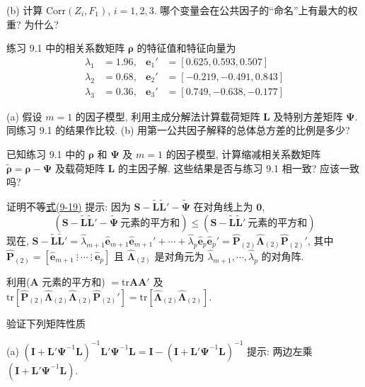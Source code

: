 
(b) 计算 $\mathrm{Corr}(Z_i,F_1)$, $i=1,2,3$. 哪个变量会在公共因子的“命名”上有最大的权重? 为什么?

\quad 练习 9.1 中的相关系数矩阵 $\boldsymbol{\rho}$ 的特征值和特征向量为
\[
\begin{aligned}
\lambda_1&=1.96, & \mathbf{e}_1'&=[0.625,0.593,0.507]\\
\lambda_2&=0.68, & \mathbf{e}_2'&=[-0.219,-0.491,0.843]\\
\lambda_3&=0.36, & \mathbf{e}_3'&=[0.749,-0.638,-0.177]
\end{aligned}
\]

(a) 假设 $m=1$ 的因子模型, 利用主成分解法计算载荷矩阵 $\mathbf{L}$ 及特别方差矩阵 $\boldsymbol{\Psi}$. 同练习 9.1 的结果作比较.
(b) 用第一公共因子解释的总体总方差的比例是多少?

\quad 已知练习 9.1 中的 $\boldsymbol{\rho}$ 和 $\boldsymbol{\Psi}$ 及 $m=1$ 的因子模型, 计算缩减相关系数矩阵 $\tilde{\boldsymbol{\rho}}=\boldsymbol{\rho}-\boldsymbol{\Psi}$ 及载荷矩阵 $\mathbf{L}$ 的主因子解. 这些结果是否与练习 9.1 相一致? 应该一致吗?

\quad 证明不等\hyperref[eq:9-19]{式(9-19)}
提示: 因为 $\mathbf{S}-\tilde{\mathbf{L}}\tilde{\mathbf{L}}'-\tilde{\boldsymbol{\Psi}}$ 在对角线上为 $\mathbf{0}$,
\[
(\mathbf{S}-\tilde{\mathbf{L}}\tilde{\mathbf{L}}'-\tilde{\boldsymbol{\Psi}}\ \text{元素的平方和})\leqslant(\mathbf{S}-\tilde{\mathbf{L}}\tilde{\mathbf{L}}'\ \text{元素的平方和})
\]
现在, $\mathbf{S}-\tilde{\mathbf{L}}\tilde{\mathbf{L}}'=\hat{\lambda}_{m+1}\hat{\mathbf{e}}_{m+1}\hat{\mathbf{e}}_{m+1}'+\cdots+\hat{\lambda}_p\hat{\mathbf{e}}_p\hat{\mathbf{e}}_p'=\hat{\mathbf{P}}_{(2)}\hat{\boldsymbol{\Lambda}}_{(2)}\hat{\mathbf{P}}_{(2)}'$, 其中 $\hat{\mathbf{P}}_{(2)}=[\hat{\mathbf{e}}_{m+1}\ \vdots\ \cdots\ \vdots\ \hat{\mathbf{e}}_p]$ 且 $\hat{\boldsymbol{\Lambda}}_{(2)}$ 是对角元为 $\hat{\lambda}_{m+1},\cdots,\hat{\lambda}_p$ 的对角阵.

利用($\mathbf{A}$ 元素的平方和) $=\mathrm{tr}\mathbf{A}\mathbf{A}'$ 及 $\mathrm{tr}[\hat{\mathbf{P}}_{(2)}\hat{\boldsymbol{\Lambda}}_{(2)}\hat{\boldsymbol{\Lambda}}_{(2)}\hat{\mathbf{P}}_{(2)}']=\mathrm{tr}[\hat{\boldsymbol{\Lambda}}_{(2)}\hat{\boldsymbol{\Lambda}}_{(2)}]$.

\quad 验证下列矩阵性质

(a) $(\mathbf{I}+\mathbf{L}'\boldsymbol{\Psi}^{-1}\mathbf{L})^{-1}\mathbf{L}'\boldsymbol{\Psi}^{-1}\mathbf{L}=\mathbf{I}-(\mathbf{I}+\mathbf{L}'\boldsymbol{\Psi}^{-1}\mathbf{L})^{-1}$
提示: 两边左乘 $(\mathbf{I}+\mathbf{L}'\boldsymbol{\Psi}^{-1}\mathbf{L})$.

